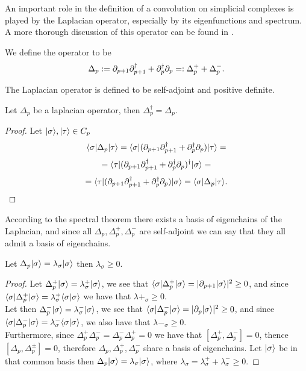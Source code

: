 \documentclass[../1.tex]{subfiles}
\begin{document}
    An important role in the definition of a convolution on simplicial complexes is played by the Laplacian operator,
    especially by its eigenfunctions and spectrum. A more thorough discussion of this operator can be found in \cite{laplacian}.
    
    \begin{defn}
        We define the  operator to be 
        \[ \Delta_p := \partial_{p+1}\partial^\dagger_{p+1} + \partial^\dagger_p\partial_p =: \Delta^+_p + \Delta^-_p.\]
    \end{defn}

    The Laplacian operator is defined to be self-adjoint and positive definite.

    \begin{prop}
        Let $\Delta_p$ be a laplacian operator, then $\Delta^\dagger_p = \Delta_p.$
    \end{prop}
    \begin{proof}
        Let $| \sigma \rangle, | \tau \rangle \in C_p$ 
        \[ \langle \sigma |\Delta_p| \tau \rangle=\langle \sigma |(\partial_{p+1}\partial^\dagger_{p+1} + \partial^\dagger_p\partial_p)| \tau \rangle = \]
        \[ = \langle \tau |(\partial_{p+1}\partial^\dagger_{p+1} + \partial^\dagger_p\partial_p)^\dagger| \sigma \rangle = \]
        \[ = \langle \tau |(\partial_{p+1}\partial^\dagger_{p+1} + \partial^\dagger_p\partial_p)| \sigma \rangle = \langle \sigma |\Delta_p| \tau \rangle. \qedhere \]
    \end{proof}

    According to the spectral theorem there exists a basis of eigenchains of the Laplacian, and since all $\Delta_p, \Delta^+_p, \Delta^-_p$
    are self-adjoint we can say that they all admit a basis of eigenchains.

    \begin{prop}
        Let $\Delta_p| \sigma \rangle = \lambda_\sigma| \sigma \rangle$ then $\lambda_\sigma \geq 0$.
    \end{prop}
    \begin{proof}
        Let $\Delta^+_p| \sigma \rangle = \lambda^+_\sigma | \sigma \rangle$, we see that $\langle \sigma |\Delta^+_p| \sigma \rangle = | \partial_{p+1}| \sigma \rangle |^2 \geq 0$, and since
        $\langle \sigma |\Delta^+_p| \sigma \rangle = \lambda^+_\sigma\langle \sigma | \sigma \rangle$ we have that $\lambda+_\sigma \geq 0.$\\
        Let then $\Delta^-_p| \sigma \rangle = \lambda^-_\sigma | \sigma \rangle$, we see that $\langle \sigma |\Delta^-_p| \sigma \rangle = | \partial_p | \sigma \rangle |^2 \geq 0$, and since
        $\langle \sigma |\Delta^-_p| \sigma \rangle = \lambda^-_\sigma\langle \sigma | \sigma \rangle$, we also have that $\lambda-_\sigma \geq 0.$\\
        Furthermore, since $\Delta^+_p\Delta^-_p = \Delta^-_p\Delta^+_p = 0$ we have that $[\Delta^+_p,\Delta^-_p] = 0$, thence
        $[\Delta_p, \Delta^\pm_p] = 0$, therefore $\Delta_p, \Delta^+_p, \Delta^-_p$ share a basis of eigenchains.
        Let $| \sigma \rangle$ be in that common basis then $\Delta_p| \sigma \rangle = \lambda_\sigma| \sigma \rangle$, where
        $\lambda_\sigma = \lambda^+_\sigma + \lambda^-_\sigma \geq 0$. \qedhere
    \end{proof}
\end{document}
